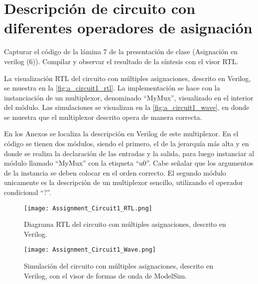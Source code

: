 \section{Descripción de circuito con diferentes operadores de asignación \label{sec:s1}}

\begin{center}
	\begin{minipage}{12cm}
		\begin{tcolorbox}[title=Actividad 1]
			Capturar el código de la lámina 7 de la presentación de clase (Asignación en verilog (6)). Compilar y observar el resultado de la síntesis con el visor RTL.
		\end{tcolorbox}	
	\end{minipage}
\end{center}

La visualización RTL del circuito con múltiples asignaciones, descrito en Verilog, se muestra en la \autoref{fig:a_circuit1_rtl}. La implementación se hace con la instanciación de un multiplexor, denominado ``MyMux'', visualizado en el interior del módulo. Las simulaciones se visualizan en la \autoref{fig:a_circuit1_wave}, en donde se muestra que el multiplexor descrito opera de manera correcta.

En los Anexos se localiza la descripción en Verilog de este multiplexor. En el código se tienen dos módulos, siendo el primero, el de la jerarquía más alta y en donde se realiza la declaración de las entradas y la salida, para luego instanciar al módulo llamado ``MyMux'' con la etiqueta ``u0''. Cabe señalar que los argumentos de la instancia se deben colocar en el orden correcto. El segundo módulo unicamente es la descripción de un multiplexor sencillo, utilizando el operador condicional ``?''.

\begin{figure}[ht]
	\centering
	\texttt{[image: Assignment\_Circuit1\_RTL.png]}
	\caption{Diagrama RTL del circuito con múltiples asignaciones, descrito en Verilog. \label{fig:a_circuit1_rtl}}
\end{figure}

\begin{figure}[ht]
	\centering
	\texttt{[image: Assignment\_Circuit1\_Wave.png]}
	\caption{Simulación del circuito con múltiples asignaciones, descrito en Verilog, con el visor de formas de onda de ModelSim. \label{fig:a_circuit1__wave}}
\end{figure}